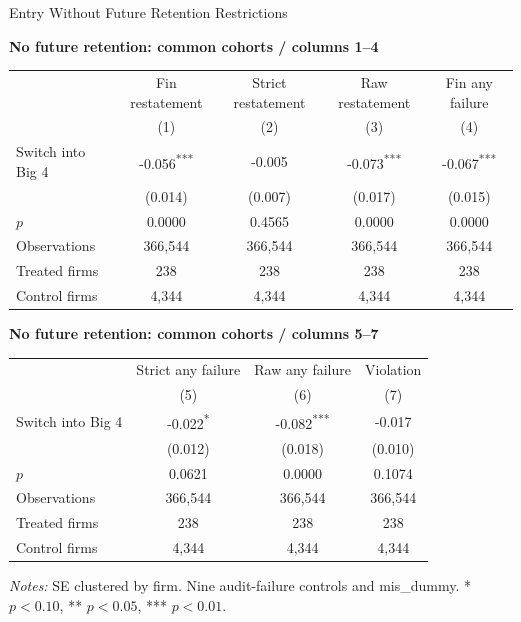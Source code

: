 \documentclass[10pt]{article}
\newcommand{\sym}[1]{\textsuperscript{#1}}
\begin{document}
\fontsize{10}{12}\selectfont
\setlength{\tabcolsep}{3pt}\renewcommand{\arraystretch}{1.15}
\begin{center}\large Entry Without Future Retention Restrictions\end{center}
\medskip\textbf{No future retention: common cohorts / columns 1--4}\par\smallskip
\begin{tabular*}{\textwidth}{@{\extracolsep{\fill}}lcccc@{}}
\toprule
 & Fin restatement & Strict restatement & Raw restatement & Fin any failure \\
 & (1) & (2) & (3) & (4) \\
\midrule
Switch into Big 4 & -0.056\sym{***} & -0.005 & -0.073\sym{***} & -0.067\sym{***} \\
 & (0.014) & (0.007) & (0.017) & (0.015) \\
$p$ & 0.0000 & 0.4565 & 0.0000 & 0.0000 \\
Observations & 366,544 & 366,544 & 366,544 & 366,544 \\
Treated firms & 238 & 238 & 238 & 238 \\
Control firms & 4,344 & 4,344 & 4,344 & 4,344 \\
\bottomrule\end{tabular*}\par
\medskip\textbf{No future retention: common cohorts / columns 5--7}\par\smallskip
\begin{tabular*}{\textwidth}{@{\extracolsep{\fill}}lccc@{}}
\toprule
 & Strict any failure & Raw any failure & Violation \\
 & (5) & (6) & (7) \\
\midrule
Switch into Big 4 & -0.022\sym{*} & -0.082\sym{***} & -0.017 \\
 & (0.012) & (0.018) & (0.010) \\
$p$ & 0.0621 & 0.0000 & 0.1074 \\
Observations & 366,544 & 366,544 & 366,544 \\
Treated firms & 238 & 238 & 238 \\
Control firms & 4,344 & 4,344 & 4,344 \\
\bottomrule\end{tabular*}\par
\medskip\fontsize{9}{11}\selectfont\textit{Notes:} SE clustered by firm. Nine audit-failure controls and mis\_dummy. * $p<0.10$, ** $p<0.05$, *** $p<0.01$.
\end{document}
